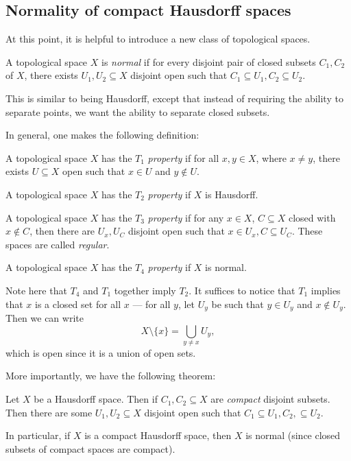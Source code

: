 \documentclass[a4paper]{article}
\begin{document}
\subsection{Normality of compact Hausdorff spaces}
At this point, it is helpful to introduce a new class of topological spaces.
\begin{defi}
  A topological space $X$ is \emph{normal} if for every disjoint pair of closed subsets $C_1, C_2$ of $X$, there exists $U_1, U_2 \subseteq X$ disjoint open such that $C_1 \subseteq U_1, C_2 \subseteq U_2$.
\end{defi}
This is similar to being Hausdorff, except that instead of requiring the ability to separate points, we want the ability to separate closed subsets.

In general, one makes the following definition:
\begin{defi}[$T_i$ space]
  A topological space $X$ has the $T_1$ \emph{property} if for all $x, y\in X$, where $x \not= y$, there exists $U\subseteq X$ open such that $x \in U$ and $y\not\in U$.

  A topological space $X$ has the $T_2$ \emph{property} if $X$ is Hausdorff.

  A topological space $X$ has the $T_3$ \emph{property} if for any $x \in X$, $C\subseteq X$ closed with $x \not\in C$, then there are $U_x, U_C$ disjoint open such that $x \in U_x, C\subseteq U_C$. These spaces are called \emph{regular}.

  A topological space $X$ has the $T_4$ \emph{property} if $X$ is normal.
\end{defi}
Note here that $T_4$ and $T_1$ together imply $T_2$. It suffices to notice that $T_1$ implies that $x$ is a closed set for all $x$ --- for all $y$, let $U_y$ be such that $y \in U_y$ and $x \not\in U_y$. Then we can write
\[
  X\setminus \{x\} = \bigcup_{y \not= x}U_y,
\]
which is open since it is a union of open sets.

More importantly, we have the following theorem:
\begin{thm}
  Let $X$ be a Hausdorff space. Then if $C_1, C_2 \subseteq X$ are \emph{compact} disjoint subsets. Then there are some $U_1, U_2 \subseteq X$ disjoint open such that $C_1 \subseteq U_1, C_2, \subseteq U_2$.

  In particular, if $X$ is a compact Hausdorff space, then $X$ is normal (since closed subsets of compact spaces are compact).
\end{thm}
\end{document}
